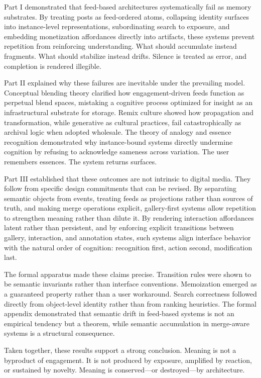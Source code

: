 \documentclass[11pt,oneside]{article}
\begin{document}
Part I demonstrated that feed-based architectures systematically fail as memory substrates. By treating posts as feed-ordered atoms, collapsing identity surfaces into instance-level representations, subordinating search to exposure, and embedding monetization affordances directly into artifacts, these systems prevent repetition from reinforcing understanding. What should accumulate instead fragments. What should stabilize instead drifts. Silence is treated as error, and completion is rendered illegible.

Part II explained why these failures are inevitable under the prevailing model. Conceptual blending theory clarified how engagement-driven feeds function as perpetual blend spaces, mistaking a cognitive process optimized for insight as an infrastructural substrate for storage. Remix culture showed how propagation and transformation, while generative as cultural practices, fail catastrophically as archival logic when adopted wholesale. The theory of analogy and essence recognition demonstrated why instance-bound systems directly undermine cognition by refusing to acknowledge sameness across variation. The user remembers essences. The system returns surfaces.

Part III established that these outcomes are not intrinsic to digital media. They follow from specific design commitments that can be revised. By separating semantic objects from events, treating feeds as projections rather than sources of truth, and making merge operations explicit, gallery-first systems allow repetition to strengthen meaning rather than dilute it. By rendering interaction affordances latent rather than persistent, and by enforcing explicit transitions between gallery, interaction, and annotation states, such systems align interface behavior with the natural order of cognition: recognition first, action second, modification last.

The formal apparatus made these claims precise. Transition rules were shown to be semantic invariants rather than interface conventions. Memoization emerged as a guaranteed property rather than a user workaround. Search correctness followed directly from object-level identity rather than from ranking heuristics. The formal appendix demonstrated that semantic drift in feed-based systems is not an empirical tendency but a theorem, while semantic accumulation in merge-aware systems is a structural consequence.

Taken together, these results support a strong conclusion. Meaning is not a byproduct of engagement. It is not produced by exposure, amplified by reaction, or sustained by novelty. Meaning is conserved—or destroyed—by architecture.
\end{document}
